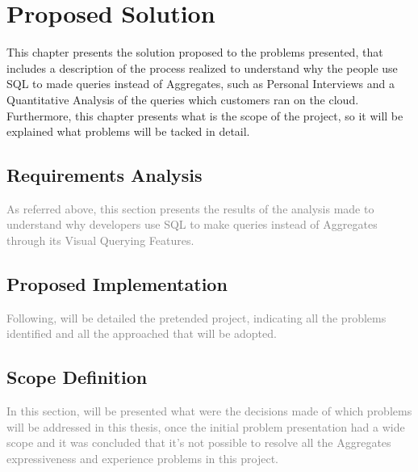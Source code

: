 \chapter{Proposed Solution}
\label{cha:proposed_solution}
This chapter presents the solution proposed to the problems presented, that includes a description of the process realized to understand why the people use SQL to made queries instead of Aggregates, such as Personal Interviews and a Quantitative Analysis of the queries which customers ran on the cloud. Furthermore, this chapter presents what is the scope of the project, so it will be explained what problems will be tacked in detail.

\section{Requirements Analysis}
\label{sec:requirements_analysis}
\textcolor{gray}{As referred above, this section presents the results of the analysis made to understand why developers use SQL to make queries instead of Aggregates through its Visual Querying Features.}

\section{Proposed Implementation}
\label{sec:proposed_implementation}
\textcolor{gray}{Following, will be detailed the pretended project, indicating all the problems identified and all the approached that will be adopted.}

\section{Scope Definition}
\label{sec:scope_definition}
\textcolor{gray}{In this section, will be presented what were the decisions made of which problems will be addressed in this thesis, once the initial problem presentation had a wide scope and it was concluded that it's not possible to resolve all the Aggregates expressiveness and experience problems in this project.}